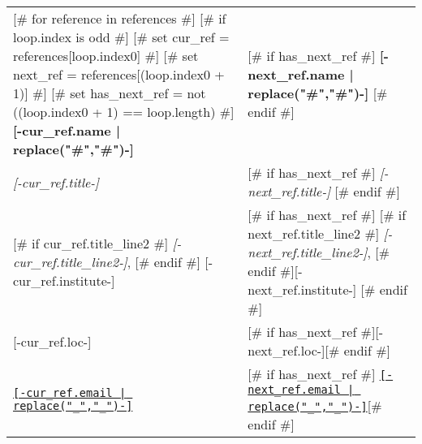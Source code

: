 \documentclass[letterpaper,11pt]{article}
\begin{document}
\begin{tabularx}{\textwidth}{@{}bb@{}}

[# for reference in references #]
	[# if loop.index is odd #]
	    [# set cur_ref = references[loop.index0] #]
		[# set next_ref = references[(loop.index0 + 1)] #]
		[# set has_next_ref = not ((loop.index0 + 1) == loop.length) #]
		\textbf{[-cur_ref.name | replace("#","\#")-]} & [# if has_next_ref #] \textbf{[-next_ref.name | replace("#","\#")-]} [# endif #] \\
		\textit{[-cur_ref.title-]} & [# if has_next_ref #] \textit{[-next_ref.title-]} [# endif #] \\
		[# if cur_ref.title_line2 #] \textit{[-cur_ref.title_line2-]}, [# endif #] [-cur_ref.institute-] & [# if has_next_ref #] [# if next_ref.title_line2 #] \textit{[-next_ref.title_line2-]}, [# endif #][-next_ref.institute-] [# endif #] \\
		[-cur_ref.loc-] & [# if has_next_ref #][-next_ref.loc-][# endif #] \\
		\href{mailto:[-cur_ref.email-]}{\texttt{[-cur_ref.email | replace("_","\_")-]}} & [# if has_next_ref #] \href{mailto:[-next_ref.email-]}{\texttt{[-next_ref.email | replace("_","\_")-]}}[# endif #] \\[2ex]
	[# endif #]
[# endfor #]

\end{tabularx}
\end{document}
